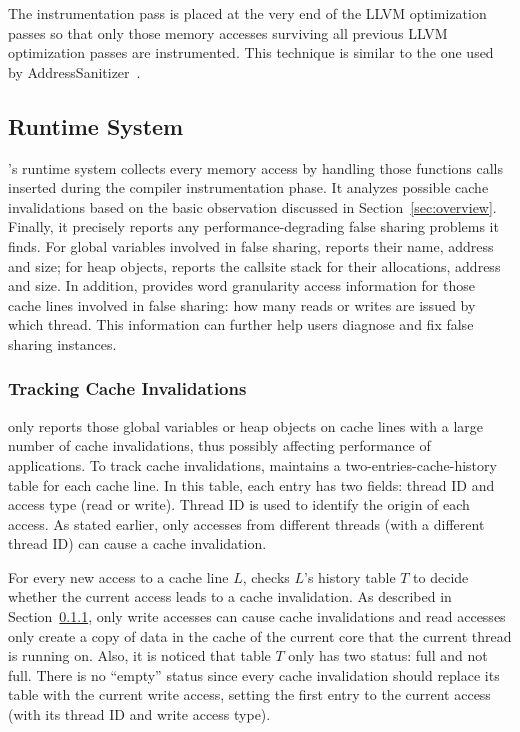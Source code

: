 The instrumentation pass is placed at the very end of the LLVM optimization passes so that only those memory accesses surviving all previous LLVM optimization passes are instrumented.  This technique is similar to the one used by AddressSanitizer~\cite{AddressSanitizer}.

\subsection{Runtime System}
\label{sec:runtime}

\Predator{}'s runtime system collects every memory access by handling those functions calls inserted during the compiler instrumentation phase. It analyzes possible cache invalidations based on the basic observation discussed in Section~\ref{sec:overview}. Finally, it precisely reports any performance-degrading false sharing problems it finds.  For global variables involved in false sharing, \Predator{} reports their name, address and size; for heap
objects, \Predator{} reports the callsite stack for their allocations, address and size. In addition, \Predator{} provides word granularity access information for those cache lines involved in false sharing: how many reads or writes are issued by which thread.  This information can further help users diagnose and fix false sharing instances.

\subsubsection{Tracking Cache Invalidations}
\Predator{} only reports those global variables or heap objects on cache lines with a large number of cache invalidations, thus possibly affecting performance of applications. To track cache invalidations, \Predator{} maintains a two-entries-cache-history table for each cache line.  In this table, each entry has two fields: thread ID and access type (read or write). Thread ID is used to identify the origin of each access. As stated earlier, only accesses from different threads (with a different thread ID) can cause a cache invalidation.

For every new access to a cache line $L$, \Predator{} checks $L$'s history table $T$ to decide whether the current access leads to a cache invalidation.  As described in Section~\ref{}, only write accesses can cause cache invalidations and read accesses only create a copy of data in the cache of the current core that the current thread is running on. Also, it is noticed that table $T$ only has two status: full and not full.  There is no ``empty'' status since every cache invalidation should replace its table with the current write access, setting the first entry to the current access (with its thread ID and write access type).

